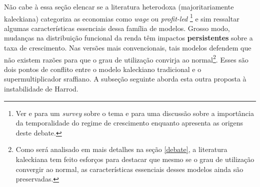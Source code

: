 
Não  cabe à essa seção elencar se a  literatura heterodoxa (majoritariamente kaleckiana)  categoriza as economias como \textit{wage} ou \textit{profit-led}
\footnote{Ver 
	\textcite{blecker_distribution_2002} 
	e \textcite{onaran_is_2013} para um  \textit{survey} sobre o tema e \textcite{blecker_wage_led_2016} para uma discussão sobre a importância da temporalidade do regime de crescimento enquanto \textcite{lavoie_origins_2017} apresenta as origens deste debate.} 
e sim ressaltar algumas  características essenciais dessa família de modelos. Grosso modo, mudanças na distribuição funcional da renda têm impactos \textbf{persistentes} sobre a taxa de crescimento. Nas versões mais convencionais, tais modelos defendem que não existem razões para que o grau de utilização convirja ao normal\footnote{Como será analisado em mais detalhes na seção \ref{debate}, a literatura kaleckiana tem feito esforços para destacar que mesmo se o grau de utilização convergir ao normal, as características essenciais desses modelos ainda são preservadas.}. Esses são dois pontos de conflito entre o modelo kaleckiano tradicional e o supermultiplicador sraffiano. A subseção seguinte aborda esta outra proposta à instabilidade de Harrod.
